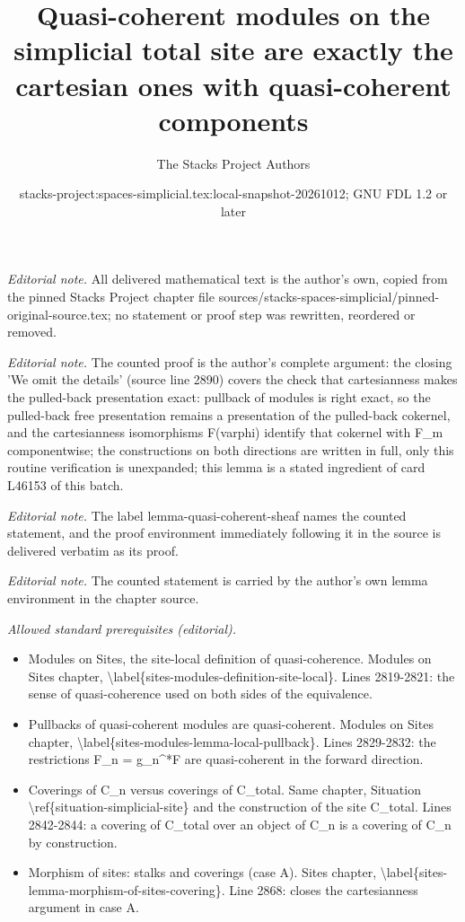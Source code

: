 \documentclass{stacks-project}
\title{Quasi-coherent modules on the simplicial total site are exactly the cartesian ones with quasi-coherent components}
\author{The Stacks Project Authors}
\date{stacks-project:spaces-simplicial.tex:local-snapshot-20261012; GNU FDL 1.2 or later}
\theoremstyle{plain}
\theoremstyle{definition}
\theoremstyle{remark}
\numberwithin{equation}{subsection}
\begin{document}
\maketitle
\noindent\textit{Editorial note.} All delivered mathematical text is the author's own, copied from the pinned Stacks Project chapter file sources/stacks-spaces-simplicial/pinned-original-source.tex; no statement or proof step was rewritten, reordered or removed.\par\medskip
\noindent\textit{Editorial note.} The counted proof is the author's complete argument: the closing 'We omit the details' (source line 2890) covers the check that cartesianness makes the pulled-back presentation exact: pullback of modules is right exact, so the pulled-back free presentation remains a presentation of the pulled-back cokernel, and the cartesianness isomorphisms F(varphi) identify that cokernel with F\_m componentwise; the constructions on both directions are written in full, only this routine verification is unexpanded; this lemma is a stated ingredient of card L46153 of this batch.\par\medskip
\noindent\textit{Editorial note.} The label lemma-quasi-coherent-sheaf names the counted statement, and the proof environment immediately following it in the source is delivered verbatim as its proof.\par\medskip
\noindent\textit{Editorial note.} The counted statement is carried by the author's own lemma environment in the chapter source.\par\medskip
\noindent\textit{Allowed standard prerequisites (editorial).}\begin{itemize}
\item Modules on Sites, the site-local definition of quasi-coherence. Modules on Sites chapter, \textbackslash{}label\{sites-modules-definition-site-local\}. Lines 2819-2821: the sense of quasi-coherence used on both sides of the equivalence.
\item Pullbacks of quasi-coherent modules are quasi-coherent. Modules on Sites chapter, \textbackslash{}label\{sites-modules-lemma-local-pullback\}. Lines 2829-2832: the restrictions F\_n = g\_n\textasciicircum{}*F are quasi-coherent in the forward direction.
\item Coverings of C\_n versus coverings of C\_total. Same chapter, Situation \textbackslash{}ref\{situation-simplicial-site\} and the construction of the site C\_total. Lines 2842-2844: a covering of C\_total over an object of C\_n is a covering of C\_n by construction.
\item Morphism of sites: stalks and coverings (case A). Sites chapter, \textbackslash{}label\{sites-lemma-morphism-of-sites-covering\}. Line 2868: closes the cartesianness argument in case A.
\end{itemize}\medskip
\end{document}
